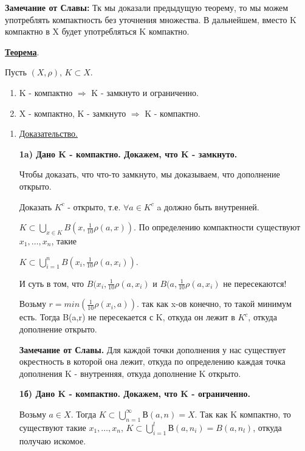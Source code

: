 \documentclass{article}
\newcommand{\thmm}[1]{\underline{\textbf{#1}}}
\begin{document}
\textbf{Замечание от Славы:} Тк мы доказали предыдущую теорему, то мы можем употреблять компактность без уточнения множества. В дальнейшем, вместо K компактно в X будет употребляться K компактно.

\thmm{Теорема}.

Пусть $(X,\rho)$, $K\subset X$.

\begin{enumerate}
    \item K - компактно $\Rightarrow$ K - замкнуто и ограниченно.
    \item X - компактно, K - замкнуто $\Rightarrow$ K - компактно.
\end{enumerate}

\begin{enumerate}
        \item[] \uline{Доказательство.}
        
       \textbf{ 1a) Дано K - компактно. Докажем, что K - замкнуто.} 
        
        Чтобы доказать, что что-то замкнуто, мы доказываем, что дополнение открыто.

        Доказать $K^c$ - открыто, т.е. $\forall a \in K^c$ a должно быть внутренней.

        $K \subset \bigcup\limits_{x \in K} B(x,\frac{1}{10}\rho(a,x))$. По определению компактности  существуют $x_1,\ldots,x_n$, такие  
        
        $K \subset \bigcup\limits_{i=1}^{n} B(x_i,\frac{1}{10}\rho(a,x_i))$.

        И суть в том, что $ B(x_i,\frac{1}{10}\rho(a,x_i)$ и $B(a,\frac{1}{10}\rho(a,x_i)$ не пересекаются!

        Возьму $ r = min(\frac{1}{10}\rho(x_i,a))$. так как x-ов конечно, то такой минимум есть. Тогда B(a,r) не пересекается с K, откуда он лежит в $K^c$, откуда дополнение открыто.

        \textbf{Замечание от Славы.} Для каждой точки дополнения у нас существует окрестность в которой она лежит, откуда по определению каждая точка дополнения K - внутренняя, откуда дополнение K открыто.
        
        \textbf{1б) Дано K - компактно. Докажем, что K - ограниченно.} 

        Возьму $a\in X$. Тогда $K\subset \bigcup\limits_{n=1}^{\infty} В(a,n) = X$. Так как K компактно, то существуют  такие $x_1,\ldots,x_n$, $K\subset \bigcup\limits_{i=1}^{l} В(a,n_i)=B(a,n_l)$, откуда получаю искомое.


\end{enumerate}
\end{document}
